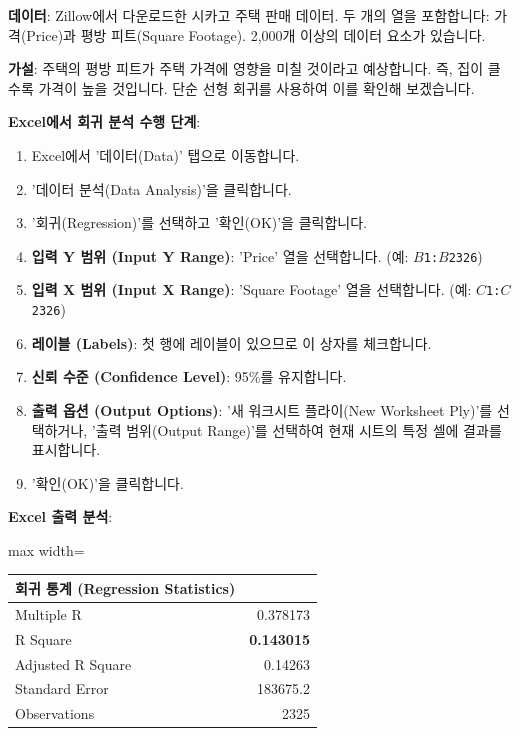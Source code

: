 \documentclass[11pt,a4paper]{book}
\theoremstyle{definition}
\begin{document}
\begin{tcolorbox}[examplebox, title={Excel 실습: Zillow 주택 데이터}]
\textbf{데이터}: Zillow에서 다운로드한 시카고 주택 판매 데이터. 두 개의 열을 포함합니다: 가격(Price)과 평방 피트(Square Footage). 2,000개 이상의 데이터 요소가 있습니다.

\textbf{가설}: 주택의 평방 피트가 주택 가격에 영향을 미칠 것이라고 예상합니다. 즉, 집이 클수록 가격이 높을 것입니다. 단순 선형 회귀를 사용하여 이를 확인해 보겠습니다.

\textbf{Excel에서 회귀 분석 수행 단계}:
\begin{enumerate}[label=\arabic*.]
    \item Excel에서 '데이터(Data)' 탭으로 이동합니다.
    \item '데이터 분석(Data Analysis)'을 클릭합니다.
    \item '회귀(Regression)'를 선택하고 '확인(OK)'을 클릭합니다.
    \item \textbf{입력 Y 범위 (Input Y Range)}: 'Price' 열을 선택합니다. (예: \texttt{$B$1:$B$2326})
    \item \textbf{입력 X 범위 (Input X Range)}: 'Square Footage' 열을 선택합니다. (예: \texttt{$C$1:$C$2326})
    \item \textbf{레이블 (Labels)}: 첫 행에 레이블이 있으므로 이 상자를 체크합니다.
    \item \textbf{신뢰 수준 (Confidence Level)}: 95\%를 유지합니다.
    \item \textbf{출력 옵션 (Output Options)}: '새 워크시트 플라이(New Worksheet Ply)'를 선택하거나, '출력 범위(Output Range)'를 선택하여 현재 시트의 특정 셀에 결과를 표시합니다.
    \item '확인(OK)'을 클릭합니다.
\end{enumerate}

\textbf{Excel 출력 분석}:
\begin{adjustbox}{max width=\textwidth}
\begin{tabular}{lr}
\toprule
\textbf{회귀 통계 (Regression Statistics)} & \\
\midrule
Multiple R & 0.378173 \\
R Square & \textbf{0.143015} \\
Adjusted R Square & 0.14263 \\
Standard Error & 183675.2 \\
Observations & 2325 \\
\bottomrule
\end{tabular}
\end{adjustbox}


\end{tcolorbox}
\end{document}
